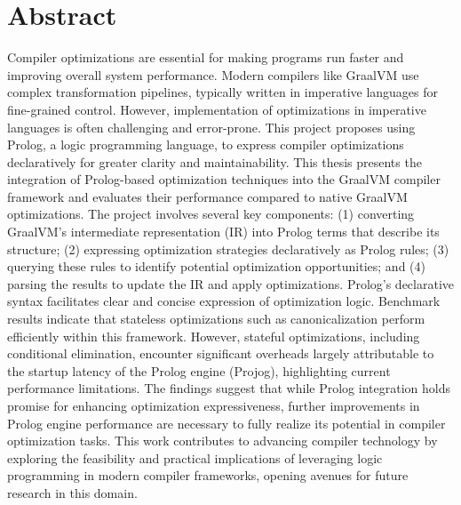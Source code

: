 \section*{Abstract}

\noindent
Compiler optimizations are essential for making programs run faster and improving overall system performance. 
Modern compilers like GraalVM use complex transformation pipelines, typically written in imperative languages for fine-grained control. However, implementation of optimizations in imperative languages is often challenging and error-prone. 
This project proposes using Prolog, a logic programming language, to express compiler optimizations declaratively for greater clarity and maintainability.
This thesis presents the integration of Prolog-based optimization techniques into the GraalVM compiler framework and evaluates their performance compared to native GraalVM optimizations. The project involves several key components: (1) converting GraalVM’s intermediate representation (IR) into Prolog terms that describe its structure; (2) expressing optimization strategies declaratively as Prolog rules; (3) querying these rules to identify potential optimization opportunities; and (4) parsing the results to update the IR and apply optimizations.
Prolog’s declarative syntax facilitates clear and concise expression of optimization logic. Benchmark results indicate that stateless optimizations such as canonicalization perform efficiently within this framework. However, stateful optimizations, including conditional elimination, encounter significant overheads largely attributable to the startup latency of the Prolog engine (Projog), highlighting current performance limitations. The findings suggest that while Prolog integration holds promise for enhancing optimization expressiveness, further improvements in Prolog engine performance are necessary to fully realize its potential in compiler optimization tasks.
This work contributes to advancing compiler technology by exploring the feasibility and practical implications of leveraging logic programming in modern compiler frameworks, opening avenues for future research in this domain.